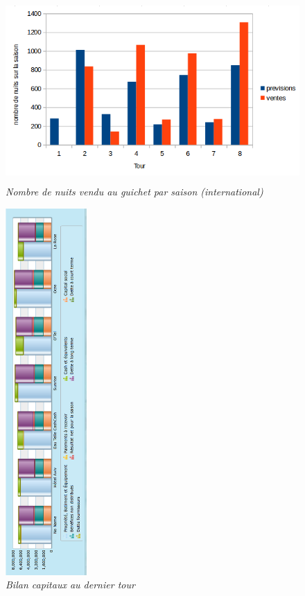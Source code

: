 \documentclass[a4paper,10pt]{article}
\begin{document}
    \begin{figure}[!ht]
      \begin{center}
	\includegraphics[height=7.0cm,keepaspectratio]{./images/ventes_internationales.png}
      \end{center}
      \caption{\textit{Nombre de nuits vendu au guichet par saison (international)}}
      \label{ventes_internationales}
    \end{figure}
    
    \begin{figure}[!ht]
      \begin{center}
	\includegraphics[height=14cm,keepaspectratio]{./images/bilan_t8.png}
      \end{center}
      \caption{\textit{Bilan capitaux au dernier tour}}
    \end{figure}
    
\end{document}
